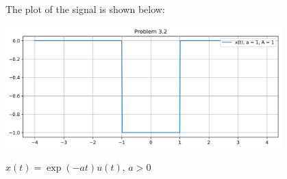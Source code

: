 \documentclass[a4paper, 10pt]{article}
\begin{document}
\begin{solution}
\newpage

The plot of the signal is shown below:
\begin{center}
    \includegraphics[width=0.8\textwidth]{images/problem_3_2.png}
\end{center}
\end{solution}


\begin{subproblems}[start=3]
    \item \( x(t) = \exp(-at)u(t), \,  a > 0 \)
\end{subproblems}
\end{document}
